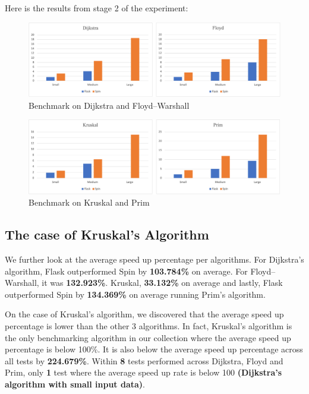 Here is the results from stage 2 of the experiment:

\bigskip
\begin{figure}[hp]
\centering
\includegraphics[scale=0.33]{images/other1}
\caption{\footnotesize{Benchmark on Dijkstra and Floyd–Warshall}}
\captionsetup{aboveskip=0pt,font=it}
\end{figure}
\bigskip

\newpage
\bigskip
\begin{figure}[hp]
\centering
\includegraphics[scale=0.33]{images/other2}
\caption{\footnotesize{Benchmark on Kruskal and Prim}}
\captionsetup{aboveskip=0pt,font=it}
\end{figure}
\bigskip


\subsection{The case of Kruskal’s Algorithm}

We further look at the average speed up percentage per algorithms. For Dijkstra's algorithm, Flask outperformed Spin by \textbf{103.784\%} on average. For Floyd–Warshall, it was \textbf{132.923\%}. Kruskal, \textbf{33.132\%} on average and lastly, Flask outperformed Spin by \textbf{134.369\%} on average running Prim's algorithm.

On the case of Kruskal’s algorithm, we discovered that the average speed up percentage is lower than the other 3 algorithms. In fact, Kruskal’s algorithm is the only benchmarking algorithm in our collection where the average speed up percentage is below 100\%. It is also below the average speed up percentage across all tests by \textbf{224.679\%}. Within \textbf{8} tests performed across Dijkstra, Floyd and Prim, only \textbf{1} test where the average speed up rate is below 100 \textbf{(Dijkstra's algorithm with small input data)}.

